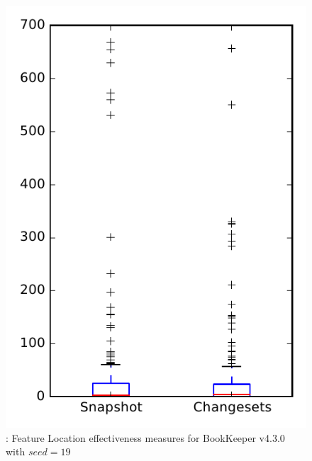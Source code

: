 
\begin{figure}
\centering
\includegraphics[height=0.4\textheight]{figures/flt_seed/rq1_bookkeeper_19}
\caption{\rone: Feature Location effectiveness measures for BookKeeper v4.3.0 with $seed=19$}
\label{fig:flt_seed:rq1:bookkeeper}
\end{figure}

